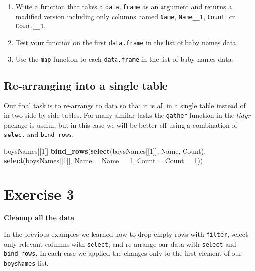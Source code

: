 \documentclass[]{book}
\newenvironment{Shaded}{\begin{snugshade}}{\end{snugshade}}
\newcommand{\KeywordTok}[1]{\textcolor[rgb]{0.13,0.29,0.53}{\textbf{#1}}}
\newcommand{\DataTypeTok}[1]{\textcolor[rgb]{0.13,0.29,0.53}{#1}}
\newcommand{\DecValTok}[1]{\textcolor[rgb]{0.00,0.00,0.81}{#1}}
\newcommand{\NormalTok}[1]{#1}
\begin{document}
\begin{enumerate}
\def\labelenumi{\arabic{enumi}.}
\item
  Write a function that takes a \texttt{data.frame} as an argument and
  returns a modified version including only columns named \texttt{Name},
  \texttt{Name\_\_1}, \texttt{Count}, or \texttt{Count\_\_1}.
\item
  Test your function on the first \texttt{data.frame} in the list of
  baby names data.
\item
  Use the \texttt{map} function to each \texttt{data.frame} in the list
  of baby names data.
\end{enumerate}

\subsection{Re-arranging into a single
table}\label{re-arranging-into-a-single-table}

Our final task is to re-arrange to data so that it is all in a single
table instead of in two side-by-side tables. For many similar tasks the
\texttt{gather} function in the \emph{tidyr} package is useful, but in
this case we will be better off using a combination of \texttt{select}
and \texttt{bind\_rows}.

\begin{Shaded}
\begin{Highlighting}[]
\NormalTok{boysNames[[}\DecValTok{1}\NormalTok{]]}
\KeywordTok{bind_rows}\NormalTok{(}\KeywordTok{select}\NormalTok{(boysNames[[}\DecValTok{1}\NormalTok{]], Name, Count),}
          \KeywordTok{select}\NormalTok{(boysNames[[}\DecValTok{1}\NormalTok{]], }\DataTypeTok{Name =}\NormalTok{ Name__}\DecValTok{1}\NormalTok{, }\DataTypeTok{Count =}\NormalTok{ Count__}\DecValTok{1}\NormalTok{))}
\end{Highlighting}
\end{Shaded}

\section{Exercise 3}\label{exercise-3-2}

\textbf{Cleanup all the data}

In the previous examples we learned how to drop empty rows with
\texttt{filter}, select only relevant columns with \texttt{select}, and
re-arrange our data with \texttt{select} and \texttt{bind\_rows}. In
each case we applied the changes only to the first element of our
\texttt{boysNames} list.
\end{document}
